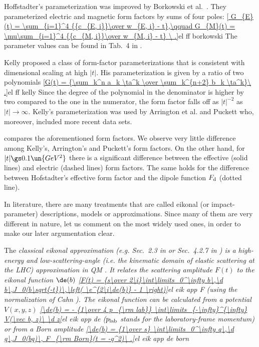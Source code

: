 Hoffstadter's parameterization was improved by Borkowski et al.~. They parameterized electric and magnetic form factors by sums of four poles:
\eqref{
G_{E}(t) = \sum_{i=1}^4 {{c_{E, i}}\over w_{E, i} - t},\qquad
G_{M}(t) = \mu\sum_{i=1}^4 {{c_{M, i}}\over w_{M, i} - t}
\ .}{el ff borkowski}
The parameter values can be found in Tab.~4 in .

Kelly  proposed a class of form-factor parameterizations that is consistent with dimensional scaling at high $|t|$. His parameterization is given by a ratio of two polynomials
\eqref{G(t) = {\sum_k^n a_k \ta^k \over \sum_k^{n+2} b_k \ta^k}\ .}{el ff kelly}
Since the degree of the polynomial in the denominator is higher by two compared to the one in the numerator, the form factor falls off as $|t|^{-2}$ as $|t|\to\infty$. Kelly's parameterization was used by Arrington et al.  and Puckett  who, moreover, included more recent data sets.

 compares the aforementioned form factors. We observe very little difference among Kelly's, Arrington's and Puckett's form factors. On the other hand, for $|t| \gs 0.1\un{GeV^2}$ there is a significant difference between the effective (solid lines) and electric (dashed lines) form factors. The same holds for the difference between Hofstadter's effective form factor and the dipole function $F_{\rm d}$ (dotted line).



In literature, there are many treatments that are called eikonal (or impact-parameter) descriptions, models or approximations. Since many of them are very different in nature, let us comment on the most widely used ones, in order to make our later argumentation clear.

The \em{classical eikonal approximation} (e.g. Sec.~2.3 in  or Sec.~4.2.7 in ) is a high-energy and low-scattering-angle (i.e. the kinematic domain of elastic scattering at the LHC) approximation in QM . It relates the scattering amplitude $F(t)$ to the eikonal function $\de(b)$
\eqref{F(t) = {s\over 2\i}\int\limits_0^\infty b\,\d b\,J_0(b\sqrt{-t})\,\left( \e^{2\i\de(b)} - 1 \right)}{el eik app F}
(using the normalization of Cahn ). The \em{eikonal} function can be calculated from a potential $V(x, y, z)$
\eqref{\de(b) = - {1\over 4 p_{\rm lab}} \int\limits_{-\infty}^{\infty} V(\vec b, z)\ \d z}{el eik app de}
($p_{\rm lab}$ stands for the laboratory-frame momentum) or from a Born amplitude
\eqref{\de(b) = {1\over s} \int\limits_0^\infty q\,\d q\,J_0(bq)\, F_{\rm Born}(t = -q^2)\ .}{el eik app de born}

